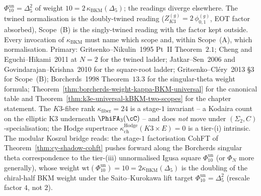 \begin{remark}
$\Phi_{10}^{\mathrm{un}} = \Delta_5^2$ of weight
$10 = 2\,\kappa_{\mathrm{BKM}}(\Delta_5)$; the readings diverge
elsewhere. The twined normalisation is the doubly-twined reading
($Z^{(g)}_{K3} = 2\,\phi^{(g)}_{0, 1}$, EOT factor absorbed),
Scope~(B) is the singly-twined reading with the factor kept outside.
Every invocation of $\kappa_{\mathrm{BKM}}$ must name which scope and,
within Scope~(A), which normalisation.
Primary: Gritsenko--Nikulin~1995 Pt~II Theorem~$2.1$; Cheng and
Eguchi--Hikami~2011 at $N = 2$ for the twined ladder; Jatkar--Sen~2006
and Govindarajan--Krishna~2010 for the square-root ladder;
Gritsenko--Cl\'ery~2013 \S3 for Scope~(B); Borcherds~1998
Theorem~$13.3$ for the singular-theta weight formula;
\cite{VolI}
Theorem~\ref{thm:borcherds-weight-kappa-BKM-universal} for the
canonical table and
\cite{VolI}
Theorem~\ref{thm:k3e-universal-kBKM-two-scopes} for the chapter
statement. The
$K3$-fibre rank $\kappa_{\mathrm{fiber}} = 24$ is a stage-$1$
invariant -- a Kodaira count on the elliptic K3 underneath
$\PhiFA_3(\cC)$ -- and does \emph{not} move under
$(\Sigma_2, C)$-specialisation; the Hodge supertrace
$\kappa_{\mathrm{ch}}^{\mathrm{Hodge}}(K3 \times E) = 0$ is a tier-(i)
intrinsic. The modular Koszul bridge reads: the stage-$1$
factorisation CohFT of Theorem~\ref{thm:cy-shadow-cohft} pushes
forward along the Borcherds singular theta correspondence to the
tier-(iii) unnormalised Igusa square $\Phi_{10}^{\mathrm{un}}$
(or $\Phi_N$ more generally), whose weight
$\mathrm{wt}(\Phi_{10}^{\mathrm{un}}) = 10 =
2 \kappa_{\mathrm{BKM}}(\Delta_5)$ is the doubling of the
chiral-half BKM weight under the Saito--Kurokawa lift target
$\Phi_{10}^{\mathrm{un}} = \Delta_5^2$ (rescale factor $4$, not $2$).
\end{remark}

